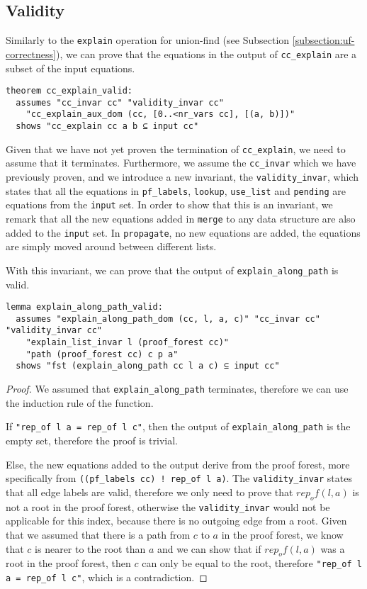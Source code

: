 \subsection{Validity}

Similarly to the \lstinline{explain} operation for union-find (see Subsection \ref{subsection:uf-correctness}), we can prove that the equations in the output of \lstinline{cc_explain} are a subset of the input equations.

\begin{lstlisting}
theorem cc_explain_valid:
  assumes "cc_invar cc" "validity_invar cc"
    "cc_explain_aux_dom (cc, [0..<nr_vars cc], [(a, b)])"
  shows "cc_explain cc a b ⊆ input cc"
\end{lstlisting}

Given that we have not yet proven the termination of \lstinline{cc_explain}, we need to assume that it terminates. Furthermore, we assume the \lstinline{cc_invar} which we have previously proven, and we introduce a new invariant, the \lstinline{validity_invar}, which states that all the equations in \lstinline{pf_labels}, \lstinline{lookup}, \lstinline{use_list} and \lstinline{pending} are equations from the \lstinline{input} set. In order to show that this is an invariant, we remark that all the new equations added in \lstinline{merge} to any data structure are also added to the \lstinline{input} set. In \lstinline{propagate}, no new equations are added, the equations are simply moved around between different lists.

With this invariant, we can prove that the output of \lstinline{explain_along_path} is valid.

\begin{lstlisting}
lemma explain_along_path_valid:
  assumes "explain_along_path_dom (cc, l, a, c)" "cc_invar cc" "validity_invar cc"
    "explain_list_invar l (proof_forest cc)"
    "path (proof_forest cc) c p a"
  shows "fst (explain_along_path cc l a c) ⊆ input cc"
\end{lstlisting}

\begin{proof}
We assumed that \lstinline{explain_along_path} terminates, therefore we can use the induction rule of the function.

If \lstinline{"rep_of l a = rep_of l c"}, then the output of \lstinline{explain_along_path} is the empty set, therefore the proof is trivial.

Else, the new equations added to the output derive from the proof forest, more specifically from \lstinline{((pf_labels cc) ! rep_of l a)}. The \lstinline{validity_invar} states that all edge labels are valid, therefore we only need to prove that $rep_of(l, a)$ is not a root in the proof forest, otherwise the \lstinline{validity_invar} would not be applicable for this index, because there is no outgoing edge from a root. Given that we assumed that there is a path from $c$ to $a$ in the proof forest, we know that $c$ is nearer to the root than $a$ and we can show that if $rep_of(l,a)$ was a root in the proof forest, then $c$ can only be equal to the root, therefore \lstinline{"rep_of l a = rep_of l c"}, which is a contradiction.
\end{proof}

